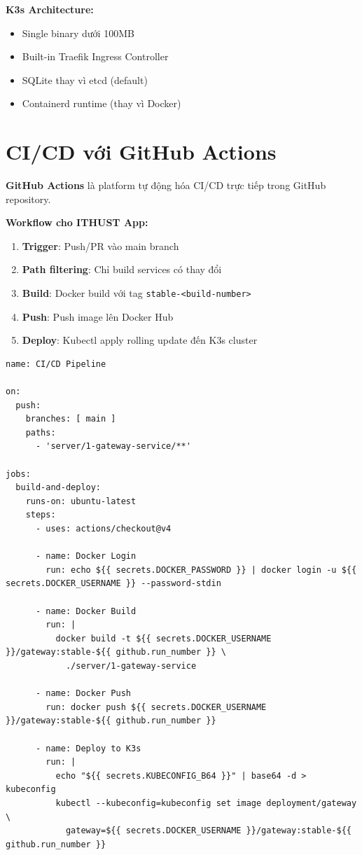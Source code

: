 \documentclass[12pt]{extreport}
\begin{document}
\textbf{K3s Architecture:}
\begin{itemize}
    \item Single binary dưới 100MB
    \item Built-in Traefik Ingress Controller
    \item SQLite thay vì etcd (default)
    \item Containerd runtime (thay vì Docker)
\end{itemize}

\section{CI/CD với GitHub Actions}

\textbf{GitHub Actions} là platform tự động hóa CI/CD trực tiếp trong GitHub repository.

\textbf{Workflow cho ITHUST App:}
\begin{enumerate}
    \item \textbf{Trigger}: Push/PR vào main branch
    \item \textbf{Path filtering}: Chỉ build services có thay đổi
    \item \textbf{Build}: Docker build với tag \texttt{stable-<build-number>}
    \item \textbf{Push}: Push image lên Docker Hub
    \item \textbf{Deploy}: Kubectl apply rolling update đến K3s cluster
\end{enumerate}

\begin{lstlisting}[style=BashStyle, caption={GitHub Actions Workflow (đơn giản hóa)}]
name: CI/CD Pipeline

on:
  push:
    branches: [ main ]
    paths:
      - 'server/1-gateway-service/**'

jobs:
  build-and-deploy:
    runs-on: ubuntu-latest
    steps:
      - uses: actions/checkout@v4
      
      - name: Docker Login
        run: echo ${{ secrets.DOCKER_PASSWORD }} | docker login -u ${{ secrets.DOCKER_USERNAME }} --password-stdin
      
      - name: Docker Build
        run: |
          docker build -t ${{ secrets.DOCKER_USERNAME }}/gateway:stable-${{ github.run_number }} \
            ./server/1-gateway-service
      
      - name: Docker Push
        run: docker push ${{ secrets.DOCKER_USERNAME }}/gateway:stable-${{ github.run_number }}
      
      - name: Deploy to K3s
        run: |
          echo "${{ secrets.KUBECONFIG_B64 }}" | base64 -d > kubeconfig
          kubectl --kubeconfig=kubeconfig set image deployment/gateway \
            gateway=${{ secrets.DOCKER_USERNAME }}/gateway:stable-${{ github.run_number }}
\end{lstlisting}
\end{document}
